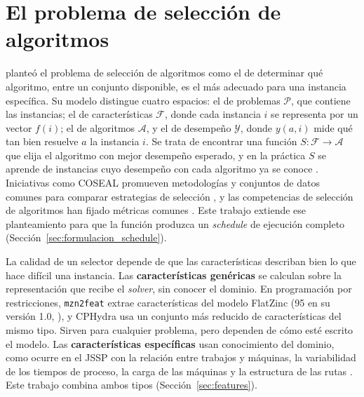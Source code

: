 \section{El problema de selección de algoritmos}
\label{sec:asp}

\citet{rice1976} planteó el problema de selección de algoritmos como el de
determinar qué algoritmo, entre un conjunto disponible, es el más adecuado
para una instancia específica. Su modelo distingue cuatro espacios: el de
problemas $\mathcal{P}$, que contiene las instancias; el de características
$\mathcal{F}$, donde cada instancia $i$ se representa por un vector $f(i)$; el
de algoritmos $\mathcal{A}$, y el de desempeño $\mathcal{Y}$, donde $y(a, i)$
mide qué tan bien resuelve $a$ la instancia $i$. Se trata de encontrar una
función $S: \mathcal{F} \rightarrow \mathcal{A}$ que elija el algoritmo con
mejor desempeño esperado, y en la práctica $S$ se aprende de instancias cuyo
desempeño con cada algoritmo ya se conoce \citep{kotthoff2014,
kerschke2019}. Iniciativas como COSEAL promueven metodologías y conjuntos de
datos comunes para comparar estrategias de selección \citep{coseal2024}, y
las competencias de selección de algoritmos han fijado métricas comunes
\citep{lindauer2019}. Este trabajo extiende ese planteamiento para que la
función produzca un \textit{schedule} de ejecución completo
(Sección~\ref{sec:formulacion_schedule}).

La calidad de un selector depende de que las características describan bien
lo que hace difícil una instancia. Las \textbf{características genéricas} se
calculan sobre la representación que recibe el \textit{solver}, sin conocer
el dominio. En programación por restricciones, \texttt{mzn2feat}
\citep{amadini2014mzn2feat} extrae características del modelo FlatZinc (95 en
su versión 1.0, \citealp{amadini2015sunnycp}), y CPHydra
\citep{omahony2008cphydra} usa un conjunto más reducido de características
del mismo tipo. Sirven para
cualquier problema, pero dependen de cómo esté escrito el modelo. Las
\textbf{características específicas} usan conocimiento del dominio, como
ocurre en el JSSP con la relación entre trabajos y máquinas, la variabilidad
de los tiempos de proceso, la carga de las máquinas y la estructura de las
rutas \citep{mirshekarian2016, strassl2022}. Este trabajo combina ambos tipos
(Sección~\ref{sec:features}).

